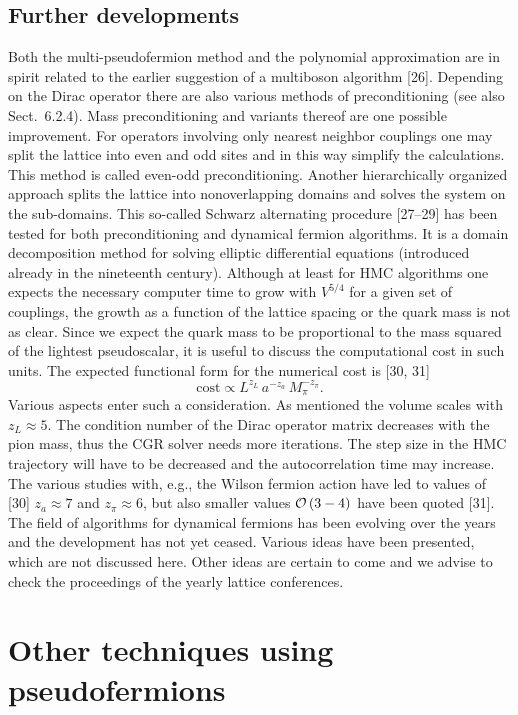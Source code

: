 \subsection{Further developments}

Both the multi-pseudofermion method and the polynomial approximation are in
spirit related to the earlier suggestion of a multiboson algorithm [26].
Depending on the Dirac operator there are also various methods of
preconditioning (see also Sect.~6.2.4). Mass preconditioning and variants
thereof are one possible improvement. For operators involving only nearest
neighbor couplings one may split the lattice into even and odd sites and in
this way simplify the calculations. This method is called even-odd
preconditioning.
Another hierarchically organized approach splits the lattice into nonoverlapping
domains and solves the system on the sub-domains. This so-called Schwarz
alternating procedure [27--29] has been tested for both preconditioning and
dynamical fermion algorithms. It is a domain decomposition method for solving
elliptic differential equations (introduced already in the nineteenth century).
Although at least for HMC algorithms one expects the necessary computer time to
grow with $V^{5/4}$ for a given set of couplings, the growth as a function of
the lattice spacing or the quark mass is not as clear. Since we expect the
quark mass to be proportional to the mass squared of the lightest pseudoscalar,
it is useful to discuss the computational cost in such units. The expected
functional form for the numerical cost is [30, 31]
\begin{equation}
\mathrm{cost} \propto L^{z_L}\,a^{-z_a}\,M_\pi^{-z_\pi}.
\end{equation}
Various aspects enter such a consideration. As mentioned the volume scales with
$z_L \approx 5$. The condition number of the Dirac operator matrix decreases
with the pion mass, thus the CGR solver needs more iterations. The step size in
the HMC trajectory will have to be decreased and the autocorrelation time may
increase. The various studies with, e.g., the Wilson fermion action have led to
values of [30] $z_a \approx 7$ and $z_\pi \approx 6$, but also smaller values
$\mathcal{O}\left(3-4\right)$ have been quoted [31].
The field of algorithms for dynamical fermions has been evolving over the years
and the development has not yet ceased. Various ideas have been presented,
which are not discussed here. Other ideas are certain to come and we advise to
check the proceedings of the yearly lattice conferences.

\section{Other techniques using pseudofermions}

